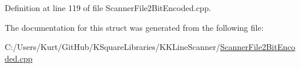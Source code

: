 Definition at line 119 of file Scanner\+File2\+Bit\+Encoded.\+cpp.



The documentation for this struct was generated from the following file\+:\begin{DoxyCompactItemize}
\item 
C\+:/\+Users/\+Kurt/\+Git\+Hub/\+K\+Square\+Libraries/\+K\+K\+Line\+Scanner/\hyperlink{_scanner_file2_bit_encoded_8cpp}{Scanner\+File2\+Bit\+Encoded.\+cpp}\end{DoxyCompactItemize}
